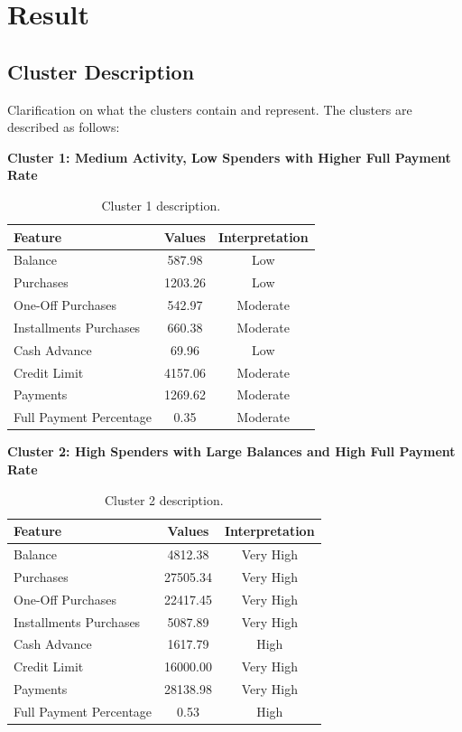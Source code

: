 \section{Result}
\subsection{Cluster Description}
Clarification on what the clusters contain and represent. The clusters are described as follows:
\vspace{0.3cm}
\par
\begin{center}
\textbf{Cluster 1: Medium Activity, Low Spenders with Higher Full Payment Rate}
\begin{table}[H]
\centering
\begin{tabular}{|l|c|c|}
\hline
\textbf{Feature} & \textbf{Values} & \textbf{Interpretation} \\ \hline
Balance & 587.98 & Low \\ \hline
Purchases & 1203.26 & Low \\ \hline
One-Off Purchases & 542.97 & Moderate \\ \hline
Installments Purchases & 660.38 & Moderate \\ \hline
Cash Advance & 69.96 & Low \\ \hline
Credit Limit & 4157.06 & Moderate \\ \hline
Payments & 1269.62 & Moderate \\ \hline
Full Payment Percentage & 0.35 & Moderate \\ \hline
\end{tabular}
\caption{Cluster 1 description.}
\end{table}

\centering
\textbf{Cluster 2: High Spenders with Large Balances and High Full Payment Rate}
\begin{table}[H]
\centering
\begin{tabular}{|l|c|c|}
\hline
\textbf{Feature} & \textbf{Values} & \textbf{Interpretation} \\ \hline
Balance & 4812.38 & Very High \\ \hline
Purchases & 27505.34 & Very High \\ \hline
One-Off Purchases & 22417.45 & Very High \\ \hline
Installments Purchases & 5087.89 & Very High \\ \hline
Cash Advance & 1617.79 & High \\ \hline
Credit Limit & 16000.00 & Very High \\ \hline
Payments & 28138.98 & Very High \\ \hline
Full Payment Percentage & 0.53 & High \\ \hline
\end{tabular}
\caption{Cluster 2 description.}
\end{table}


\end{center}
